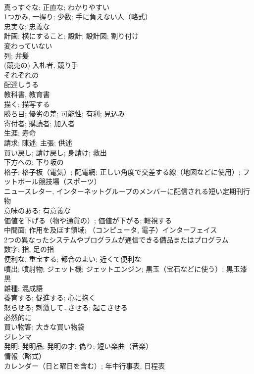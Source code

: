 \documentclass[8pt]{extreport}
\begin{document}
\begin{CJK}{UTF8}{min}
\\	真っすぐな; 正直な; わかりやすい	
\\	1つかみ, 一握り; 少数; 手に負えない人（略式）	
\\	忠実な; 忠義な	
\\	計画; 横にすること; 設計; 設計図; 割り付け	
\\	変わっていない	
\\	列; 弁髪	
\\	(競売の) 入札者, 競り手	
\\	それぞれの	
\\	配達しうる	
\\	教科書, 教育書	
\\	描く; 描写する	
\\	勝ち目; 優劣の差; 可能性; 有利; 見込み	
\\	寄付者; 購読者; 加入者	
\\	生涯; 寿命	
\\	請求; 陳述; 主張; 供述	
\\	買い戻し; 請け戻し; 身請け; 救出	
\\	下方への; 下り坂の	
\\	格子; 格子板（電気）; 配電網; 正しい角度で交差する線（地図などに使用）; フットボール競技場（スポーツ）	
\\	ニュースレター, インターネットグループのメンバーに配信される短い定期刊行物	
\\	意味のある; 有意義な	
\\	価値を下げる（物や通貨の）; 価値が下がる; 軽視する	
\\	中間面; 作用を及ぼす領域; （コンピュータ, 電子）インターフェイス 
\\	2つの異なったシステムやプログラムが通信できる備品またはプログラム	
\\	数字; 指, 足の指	
\\	便利な, 重宝する; 都合のよい; 近くて便利な	
\\	噴出; 噴射物; ジェット機; ジェットエンジン; 黒玉（宝石などに使う）; 黒玉漆黒	
\\	雑種; 混成語	
\\	養育する; 促進する; 心に抱く	
\\	怒らせる; 刺激して…させる; 起こさせる	
\\	必然的に	
\\	買い物客; 大きな買い物袋	
\\	ジレンマ	
\\	発明; 発明品; 発明の才; 偽り; 短い楽曲（音楽）	
\\	情報（略式）	
\\	カレンダー（日と曜日を含む）; 年中行事表, 日程表	

\end{CJK}
\end{document}
